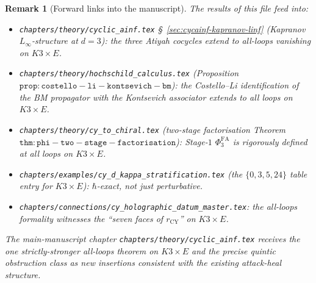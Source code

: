 \documentclass[11pt]{article}
\newtheorem{remark}[theorem]{Remark}
\providecommand{\PhiFA}{\Phi^{\mathrm{FA}}}
\begin{document}
\begin{remark}[Forward links into the manuscript]
\label{rem:forward-links}
The results of this file feed into:
\begin{itemize}
\item \texttt{chapters/theory/cyclic\_ainf.tex}
§~\ref{sec:cycainf-kapranov-linf} (Kapranov $L_\infty$-structure
at $d = 3$): the three Atiyah cocycles extend to all-loops
vanishing on $K3\times E$.
\item \texttt{chapters/theory/hochschild\_calculus.tex}
(Proposition $\mathtt{prop:costello-li-kontsevich-bm}$): the
Costello--Li identification of the BM propagator with the
Kontsevich associator extends to all loops on $K3 \times E$.
\item \texttt{chapters/theory/cy\_to\_chiral.tex} (two-stage
factorisation Theorem $\mathtt{thm:phi-two-stage-factorisation}$):
Stage-$1$ $\PhiFA_3$ is rigorously defined at all loops on
$K3 \times E$.
\item \texttt{chapters/examples/cy\_d\_kappa\_stratification.tex}
(the $\{0, 3, 5, 24\}$ table entry for $K3 \times E$):
$\hbar$-exact, not just perturbative.
\item \texttt{chapters/connections/cy\_holographic\_datum\_master.tex}:
the all-loops formality witnesses the ``seven faces of $r_{\mathrm{CY}}$''
on $K3 \times E$.
\end{itemize}
The main-manuscript chapter \texttt{chapters/theory/cyclic\_ainf.tex}
receives the one strictly-stronger all-loops theorem on $K3 \times E$
and the precise quintic obstruction class as new insertions
consistent with the existing attack-heal structure.
\end{remark}
\end{document}
